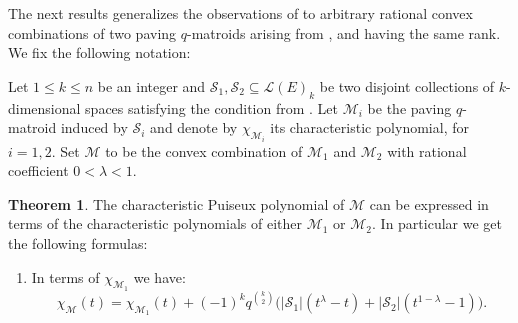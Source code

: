 \documentclass[a4paper,11pt,reqno]{amsart}
\theoremstyle{definition}
\newtheorem{theorem}{Theorem}[section]
\newcommand{\mM}{\mathcal{M}}
\newcommand{\mL}{\mathcal{L}}
\newcommand{\mS}{\mathcal{S}}
\begin{document}
{The next results generalizes the observations of  to arbitrary rational convex combinations of two paving $q$-matroids arising from , and having the same rank. We fix the following notation:

Let $1\leq k\leq n$ be an integer and $\mS_1,\mS_2\subseteq\mL(E)_k$ be two disjoint collections of $k$-dimensional spaces satisfying the condition from . Let $\mM_i$ be the paving $q$-matroid induced by $\mS_i$ and denote by $\chi_{\mM_i}$ its characteristic polynomial, for $i=1,2$. Set $\mM$ to be the convex combination of $\mM_1$ and $\mM_2$ with rational coefficient $0<\lambda<1$.

\begin{theorem}\label{prop: char_Puiseux_series_paving_conv_comb}
    The characteristic Puiseux polynomial of $\mM$ can be expressed in terms of the characteristic polynomials of either $\mM_1$ or $\mM_2$. In particular we get the following formulas:
    \begin{enumerate}
        \item In terms of $\chi_{\mM_1}$ we have:
        \[
            \chi_{\mM}(t)=\chi_{\mM_1}(t)+(-1)^kq^{k\choose 2}\Big(|\mS_1|(t^\lambda-t)+|\mS_2|(t^{1-\lambda}-1)\Big).
        \]


\end{enumerate}
\end{theorem}}
\end{document}
